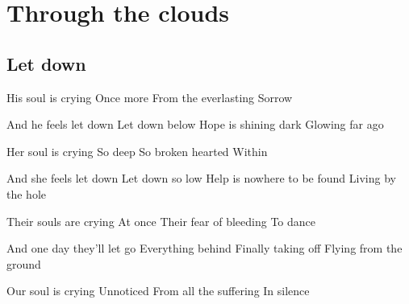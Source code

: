 \documentclass{article}
\newenvironment{album}[1]%
{%
  \section*{#1}
}%
{%
}
\newenvironment{song}[1]%
{%
  \subsection*{\textbf{#1}}
  \begin{multicols*}{2}
}%
{%
  \end{multicols*}
  \newpage
}
\newenvironment{couplet} %
{%
  \verbatim
}%
{% end code
  \endverbatim
}
\newenvironment{refrain} %
{%
  \verbatim
}%
{% end code
  \endverbatim
}
\begin{document}
\begin{album}{Through the clouds}
\begin{song}{Let down}
\begin{couplet}
His soul is crying
Once more
From the everlasting
Sorrow
\end{couplet}
\begin{refrain}
And he feels let down
Let down below
Hope is shining dark
Glowing far ago  
\end{refrain}  
\begin{couplet}
Her soul is crying
So deep
So broken hearted
Within  
\end{couplet}
\begin{refrain}
And she feels let down
Let down so low
Help is nowhere to be found
Living by the hole  
\end{refrain}
\begin{couplet}
Their souls are crying
At once
Their fear of bleeding
To dance  
\end{couplet}
\begin{refrain}
And one day they'll let go
Everything behind
Finally taking off
Flying from the ground  
\end{refrain}
\begin{couplet}
Our soul is crying
Unnoticed
From all the suffering
In silence  
\end{couplet}
\end{song}

\end{album}
\end{document}
